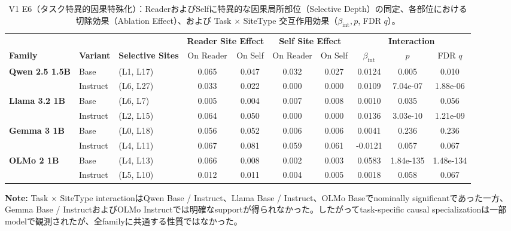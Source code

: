\begin{table}[htbp]
\centering
\small
\caption{V1 E6（タスク特異的因果特殊化）：ReaderおよびSelfに特異的な因果局所部位（Selective Depth）の同定、各部位における切除効果（Ablation Effect）、および Task $\times$ SiteType 交互作用効果（$\beta_{\text{int}}, p$, FDR $q$）。}
\label{tab:v1_specialization}
\begin{tabular}{lll cccc ccc}
\toprule
 & & & \multicolumn{2}{c}{\textbf{Reader Site Effect}} & \multicolumn{2}{c}{\textbf{Self Site Effect}} & \multicolumn{3}{c}{\textbf{Interaction}} \\
\cmidrule(lr){4-5} \cmidrule(lr){6-7} \cmidrule(lr){8-10}
\textbf{Family} & \textbf{Variant} & \textbf{Selective Sites} & On Reader & On Self & On Reader & On Self & $\beta_{\text{int}}$ & $p$ & FDR $q$ \\
\midrule
\multirow{2}{*}{\textbf{Qwen 2.5 1.5B}} & Base       & (L1, L17)          & 0.065      & 0.047      & 0.032      & 0.027      & 0.0124     & 0.005      & 0.010      \\
\cmidrule(lr){2-10}
                                 & Instruct   & (L6, L27)          & 0.033      & 0.022      & 0.000      & 0.000      & 0.0109     & 7.04e-07   & 1.88e-06   \\
\midrule
\multirow{2}{*}{\textbf{Llama 3.2 1B}} & Base       & (L6, L7)           & 0.005      & 0.004      & 0.007      & 0.008      & 0.0010     & 0.035      & 0.056      \\
\cmidrule(lr){2-10}
                                 & Instruct   & (L2, L15)          & 0.064      & 0.050      & 0.000      & 0.000      & 0.0136     & 3.03e-10   & 1.21e-09   \\
\midrule
\multirow{2}{*}{\textbf{Gemma 3 1B}} & Base       & (L0, L18)          & 0.056      & 0.052      & 0.006      & 0.006      & 0.0041     & 0.236      & 0.236      \\
\cmidrule(lr){2-10}
                                 & Instruct   & (L4, L11)          & 0.067      & 0.081      & 0.059      & 0.061      & -0.0121    & 0.057      & 0.067      \\
\midrule
\multirow{2}{*}{\textbf{OLMo 2 1B}} & Base       & (L4, L13)          & 0.066      & 0.008      & 0.002      & 0.003      & 0.0583     & 1.84e-135  & 1.48e-134  \\
\cmidrule(lr){2-10}
                                 & Instruct   & (L5, L10)          & 0.012      & 0.011      & 0.004      & 0.005      & 0.0018     & 0.058      & 0.067      \\
\bottomrule
\end{tabular}
\vspace{1ex}
\begin{minipage}{\linewidth}
\footnotesize
\textbf{Note:} Task $\times$ SiteType interactionはQwen Base / Instruct、Llama Base / Instruct、OLMo Baseでnominally significantであった一方、Gemma Base / InstructおよびOLMo Instructでは明確なsupportが得られなかった。したがってtask-specific causal specializationは一部modelで観測されたが、全familyに共通する性質ではなかった。
\end{minipage}
\end{table}
